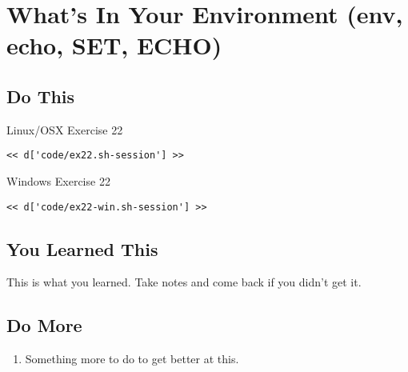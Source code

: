 \chapter{What's In Your Environment (env, echo, SET, ECHO)}

\section{Do This}

\begin{code}{Linux/OSX Exercise 22}
\begin{Verbatim}
<< d['code/ex22.sh-session'] >>
\end{Verbatim}
\end{code}

\begin{code}{Windows Exercise 22}
\begin{Verbatim}
<< d['code/ex22-win.sh-session'] >>
\end{Verbatim}
\end{code}

\section{You Learned This}

This is what you learned.  Take notes and come back if you didn't get it.

\section{Do More}

\begin{enumerate}
\item Something more to do to get better at this.
\end{enumerate}

